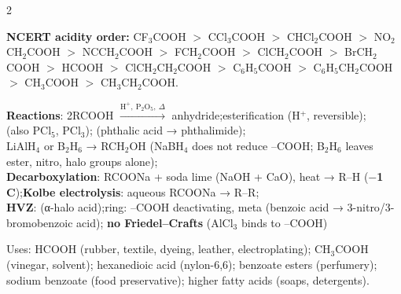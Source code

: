 \documentclass[9pt,a4paper]{extarticle}
\newcommand{\nr}[1]{\textbf{\color{uc!85!black}#1}}
\begin{document}
\begin{multicols}{2}
\begin{fl}
\end{fl}
{\scriptsize\textbf{NCERT acidity order:} CF$_3$COOH $>$ CCl$_3$COOH $>$ CHCl$_2$COOH $>$ NO$_2$CH$_2$COOH $>$ NCCH$_2$COOH $>$ FCH$_2$COOH $>$ ClCH$_2$COOH $>$ BrCH$_2$COOH $>$ HCOOH $>$ ClCH$_2$CH$_2$COOH $>$ C$_6$H$_5$COOH $>$ C$_6$H$_5$CH$_2$COOH $>$ CH$_3$COOH $>$ CH$_3$CH$_2$COOH.\par}
\begin{kbox}
\textbf{Reactions}: 2RCOOH $\xrightarrow{\text{H}^+,\ \text{P}_2\text{O}_5,\ \Delta}$ anhydride;\quad esterification (H$^+$, reversible);\\
 (also PCl$_5$, PCl$_3$);\quad {} (phthalic acid → phthalimide);\\
LiAlH$_4$ or B$_2$H$_6$ → RCH$_2$OH (NaBH$_4$ does not reduce --COOH; B$_2$H$_6$ leaves ester, nitro, halo groups alone);\\
\textbf{Decarboxylation}: RCOONa + soda lime (NaOH + CaO), heat → R--H (\textbf{$-$1 C});\quad \nr{Kolbe electrolysis}: aqueous RCOONa → R--R;\\
\nr{HVZ}:  (α-halo acid);\quad ring: --COOH deactivating, meta (benzoic acid → 3-nitro/3-bromobenzoic acid); \textbf{no Friedel--Crafts} (AlCl$_3$ binds to --COOH)
\end{kbox}
\begin{fl}
\item Uses: HCOOH (rubber, textile, dyeing, leather, electroplating); CH$_3$COOH (vinegar, solvent); hexanedioic acid (nylon-6,6); benzoate esters (perfumery); sodium benzoate (food preservative); higher fatty acids (soaps, detergents).
\end{fl}


\end{multicols}
\end{document}
